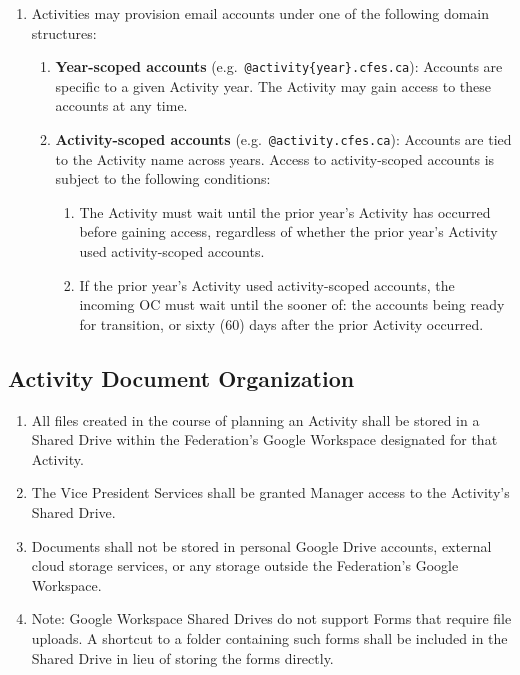 \begin{enumerate}
 \item
  Activities may provision email accounts under one of the following domain structures:

  \begin{enumerate}
   \item
    \textbf{Year-scoped accounts} (e.g.\ \texttt{@activity\{year\}.cfes.ca}): Accounts are specific to a given Activity year. The Activity may gain access to these accounts at any time.
   \item
    \textbf{Activity-scoped accounts} (e.g.\ \texttt{@activity.cfes.ca}): Accounts are tied to the Activity name across years. Access to activity-scoped accounts is subject to the following conditions:
    \begin{enumerate}
     \item
      The Activity must wait until the prior year's Activity has occurred before gaining access, regardless of whether the prior year's Activity used activity-scoped accounts.
     \item
      If the prior year's Activity used activity-scoped accounts, the incoming OC must wait until the sooner of: the accounts being ready for transition, or sixty (60) days after the prior Activity occurred.
    \end{enumerate}
  \end{enumerate}
\end{enumerate}

\subsection{Activity Document Organization}
\label{activity-document-organization}

\begin{enumerate}
 \item
  All files created in the course of planning an Activity shall be stored in a Shared Drive within the Federation's Google Workspace designated for that Activity.
 \item
  The Vice President Services shall be granted Manager access to the Activity's Shared Drive.
 \item
  Documents shall not be stored in personal Google Drive accounts, external cloud storage services, or any storage outside the Federation's Google Workspace.
 \item
  Note: Google Workspace Shared Drives do not support Forms that require file uploads. A shortcut to a folder containing such forms shall be included in the Shared Drive in lieu of storing the forms directly.
\end{enumerate}

